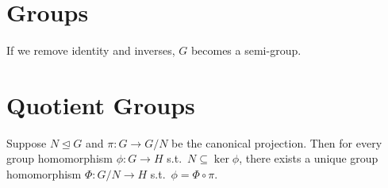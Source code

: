 \documentclass[12pt,class=article,crop=false]{standalone}
\begin{document}
\section{Groups}

\begin{remark}
If we remove identity and inverses, $ G$ becomes a semi-group.
\end{remark}

\section{Quotient Groups}
\begin{thm}
Suppose $ N \trianglelefteq G$ and $ \pi: G \to G /N$ be the canonical projection. Then for every group homomorphism $ \phi: G \to H$ s.t.\ $ N \subseteq \ker \phi$, there exists a unique group homomorphism $ \Phi : G /N \to H$ s.t.\ $ \phi = \Phi \circ \pi$.
\end{thm}
\end{document}
